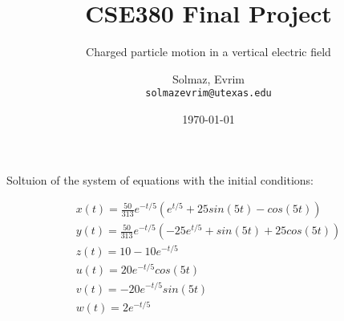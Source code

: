 \documentclass[notitlepage,11pt,oneside]{scrartcl}
\author{
	Solmaz, Evrim			\\\texttt{solmazevrim@utexas.edu}
}
\title{CSE380 Final Project}
\subtitle{Charged particle motion in a vertical electric field}
\date{\today}
\begin{document}
\maketitle

Soltuion of the system of equations with the initial conditions:

\begin{eqnarray}
x(t)=\frac{50}{313}e^{-t/5}(e^{t/5}+25sin(5t)-cos(5t)) \\
y(t)=\frac{50}{313}e^{-t/5}(-25e^{t/5}+sin(5t)+25cos(5t)) \\
z(t)=10-10e^{-t/5} \\
u(t)=20e^{-t/5}cos(5t) \\
v(t)=-20e^{-t/5}sin(5t) \\
w(t)=2e^{-t/5}
\end{eqnarray}
\end{document}
